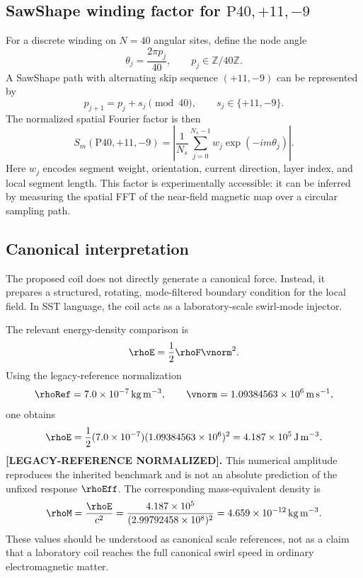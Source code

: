 \subsection{SawShape winding factor for \texorpdfstring{$\mathrm{P40},+11,-9$}{P40,+11,-9}}

For a discrete winding on $N=40$ angular sites, define the node angle
\begin{equation}
\theta_j=\frac{2\pi p_j}{40},
\qquad p_j\in\mathbb{Z}/40\mathbb{Z}.
\end{equation}
A SawShape path with alternating skip sequence $(+11,-9)$ can be represented by
\begin{equation}
p_{j+1}
=
p_j + s_j
\pmod{40},
\qquad
s_j\in\{+11,-9\}.
\end{equation}
The normalized spatial Fourier factor is then
\begin{equation}
\boxed{
S_m(\mathrm{P40},+11,-9)
=
\left|
\frac{1}{N_s}
\sum_{j=0}^{N_s-1}
w_j
\exp(-i m \theta_j)
\right|
}.
\label{eq:appendix_sawshape_factor}
\end{equation}
Here $w_j$ encodes segment weight, orientation, current direction, layer index, and local segment length. This factor is experimentally accessible: it can be inferred by measuring the spatial FFT of the near-field magnetic map over a circular sampling path.

\subsection{Canonical interpretation}

The proposed coil does not directly generate a canonical force. Instead, it prepares a structured, rotating, mode-filtered boundary condition for the local field. In SST language, the coil acts as a laboratory-scale swirl-mode injector.

The relevant energy-density comparison is
\begin{equation}
\rhoE
=
\frac{1}{2}\rhoF \vnorm^2.
\end{equation}
Using the legacy-reference normalization
\[
\rhoRef = 7.0\times10^{-7}\,\mathrm{kg\,m^{-3}},
\qquad
\vnorm = 1.09384563\times10^{6}\,\mathrm{m\,s^{-1}},
\]
one obtains
\begin{equation}
\rhoE
=
\frac{1}{2}
(7.0\times10^{-7})
(1.09384563\times10^{6})^2
=
4.187\times10^{5}\,\mathrm{J\,m^{-3}}.
\end{equation}
\textbf{[LEGACY-REFERENCE NORMALIZED].}
This numerical amplitude reproduces the inherited benchmark and is not an
absolute prediction of the unfixed response \(\rhoEff\).
The corresponding mass-equivalent density is
\begin{equation}
\rhoM
=
\frac{\rhoE}{c^2}
=
\frac{4.187\times10^{5}}
{(2.99792458\times10^{8})^2}
=
4.659\times10^{-12}\,\mathrm{kg\,m^{-3}}.
\end{equation}
These values should be understood as canonical scale references, not as a claim that a laboratory coil reaches the full canonical swirl speed in ordinary electromagnetic matter.

